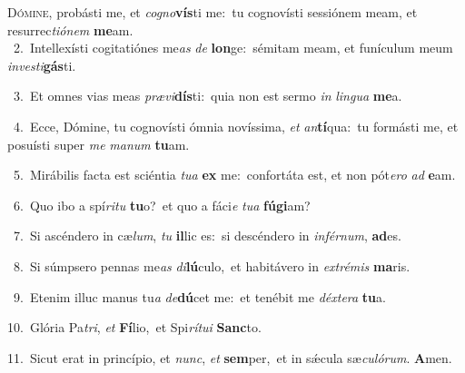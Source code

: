 \lettrine{\initial\textcolor{\initialcolor}{D}}{ómine,} probásti me, et \textit{co}\-\textit{gno}\textbf{vís}ti me:~\star tu cognovísti sessiónem meam, et resurrec\-\textit{ti}\-\textit{ó}\textit{nem} \textbf{me}\-am.\\
{\numbfont\textcolor{\numbcolor}{~2.}}~Intellexísti cogitatiónes me\textit{as} \textit{de} \textbf{lon}\-ge:~\star sémitam meam, et funículum meum \textit{in}\-\textit{ves}\textit{ti}\textbf{gás}ti.\par
{\numbfont\textcolor{\numbcolor}{~3.}}~Et omnes vias meas \textit{præ}\-\textit{vi}\textbf{dís}ti:~\star quia non est sermo \textit{in} \textit{lin}\-\textit{gua} \textbf{me}\-a.\par
{\numbfont\textcolor{\numbcolor}{~4.}}~Ecce, Dómine, tu cognovísti ómnia novíssima, \textit{et} \textit{an}\-\textbf{tí}qua:~\star tu formásti me, et posuísti super \textit{me} \textit{ma}\-\textit{num} \textbf{tu}\-am.\par
{\numbfont\textcolor{\numbcolor}{~5.}}~Mirábilis facta est sciéntia \textit{tu}\-\textit{a} \textbf{ex} me:~\star confortáta est, et non pót\-\textit{e}\-\textit{ro} \textit{ad} \textbf{e}\-am.\par
{\numbfont\textcolor{\numbcolor}{~6.}}~Quo ibo a spí\-\textit{ri}\-\textit{tu} \textbf{tu}\-o?~\star et quo a fáci\textit{e} \textit{tu}\-\textit{a} \textbf{fú}\-\textbf{gi}am?\par
{\numbfont\textcolor{\numbcolor}{~7.}}~Si ascéndero in cæ\-\textit{lum}\-, \textit{tu} \textbf{il}\-lic es:~\star si descéndero in \textit{in}\-\textit{fér}\textit{num}, \textbf{ad}\-es.\par
{\numbfont\textcolor{\numbcolor}{~8.}}~Si súmpsero pennas me\textit{as} \textit{di}\-\textbf{lú}culo,~\star et habitávero in \textit{ex}\-\textit{tré}\textit{mis} \textbf{ma}\-ris.\par
{\numbfont\textcolor{\numbcolor}{~9.}}~Etenim illuc manus tu\textit{a} \textit{de}\-\textbf{dú}cet me:~\star et tenébit me \textit{déx}\-\textit{te}\textit{ra} \textbf{tu}\-a.\par
{\numbfont\textcolor{\numbcolor}{10.}}~Glória Pa\-\textit{tri}\-, \textit{et} \textbf{Fí}\-lio,~\star et Spi\-\textit{rí}\-\textit{tu}\textit{i} \textbf{Sanc}\-to.\par
{\numbfont\textcolor{\numbcolor}{11.}}~Sicut erat in princípio, et \textit{nunc}\-, \textit{et} \textbf{sem}\-per,~\star et in sǽcula sæ\-\textit{cu}\-\textit{ló}\textit{rum}. \textbf{A}\-men.\par
